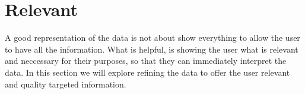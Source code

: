 
\section{Relevant}
A good representation of the data is not about show everything to allow the user to have all the information.
What is helpful, is showing the user what is relevant and neccessary for their purposes, so that they can immediately interpret the data.
In this section we will explore refining the data to offer the user relevant and quality targeted information.



